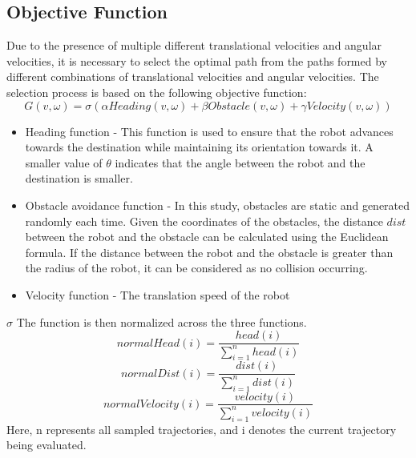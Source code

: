 \documentclass[crop=false]{standalone}
\begin{document}
	\subsection{Objective Function}
	Due to the presence of multiple different translational velocities and angular velocities, it is necessary to select the optimal path from the paths formed by different combinations of translational velocities and angular velocities. The selection process is based on the following objective function:
	\begin{equation}
		G(v, \omega)=\sigma(\alpha Heading(v, \omega) + \beta Obstacle(v, \omega) + \gamma Velocity(v, \omega))
	\end{equation}
	\begin{itemize}
		\item Heading function - This function is used to ensure that the robot advances towards the destination while maintaining its orientation towards it. A smaller value of $\theta$ indicates that the angle between the robot and the destination is smaller.
		\item Obstacle avoidance function - In this study, obstacles are static and generated randomly each time. Given the coordinates of the obstacles, the distance $dist$ between the robot and the obstacle can be calculated using the Euclidean formula. If the distance between the robot and the obstacle is greater than the radius of the robot, it can be considered as no collision occurring.
		\item Velocity function - The translation speed of the robot
	\end{itemize}
	$\sigma$ 
	The function is then normalized across the three functions.
	\begin{equation}
		normalHead(i)=\frac{head(i)}{\sum_{i=1}^{n}{head(i)}}
	\end{equation}
	\begin{equation}
		normalDist(i)=\frac{dist(i)}{\sum_{i=1}^{n}{dist(i)}}
	\end{equation}
	\begin{equation}
		normalVelocity(i)=\frac{velocity(i)}{\sum_{i=1}^{n}{velocity(i)}}
	\end{equation}
	Here, n represents all sampled trajectories, and i denotes the current trajectory being evaluated.
\end{document}
